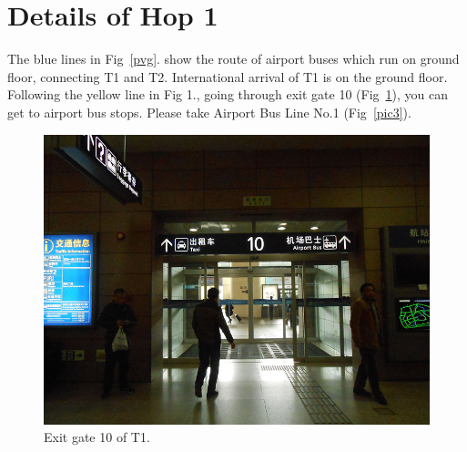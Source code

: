 \documentclass[11pt]{article}
\begin{document}
\section{Details of Hop 1}

The blue lines in Fig~\ref{pvg}. show the route of airport buses which run on ground floor, connecting T1 and T2. 
International arrival of T1 is on the ground floor. Following the yellow line in Fig 1., going through exit gate 10 (Fig~\ref{pic2}), 
you can get to airport bus stops. Please take Airport Bus Line No.1 (Fig~\ref{pic3}).

\begin{figure}[h]
    \centering
    	\includegraphics{image003.jpg}
    	\caption{Exit gate 10 of T1.\label{pic2}}
 \end{figure}
		 
\end{document}
